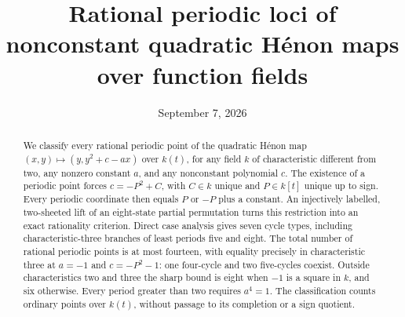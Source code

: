 \documentclass[11pt]{article}
\title{Rational periodic loci of nonconstant quadratic\texorpdfstring{ H\'enon}{ Henon} maps over function fields}
\author{}
\date{September 7, 2026}
\theoremstyle{remark}
\numberwithin{equation}{section}
\begin{document}
\maketitle
\begin{abstract}
We classify every rational periodic point of the quadratic H\'enon map
$(x,y)\mapsto(y,y^2+c-a x)$ over $k(t)$, for any field $k$ of
characteristic different from two, any nonzero constant $a$, and any
nonconstant polynomial $c$. The existence of a periodic point forces
$c=-P^2+C$, with $C\in k$ unique and $P\in k[t]$ unique up to sign.
Every periodic coordinate then equals $P$ or $-P$ plus a constant.
An injectively labelled, two-sheeted lift of an eight-state
partial permutation turns this restriction into an exact rationality
criterion. Direct case analysis gives seven cycle types, including
characteristic-three branches of least periods five and eight.
The total number of rational periodic points is at most fourteen,
with equality precisely in characteristic three at $a=-1$ and
$c=-P^2-1$: one four-cycle and two five-cycles coexist. Outside
characteristics two and three the sharp bound is eight when $-1$
is a square in $k$, and six otherwise. Every period greater than
two requires $a^4=1$. The classification counts ordinary points
over $k(t)$, without passage to its completion or a sign quotient.
\end{abstract}









\end{document}
